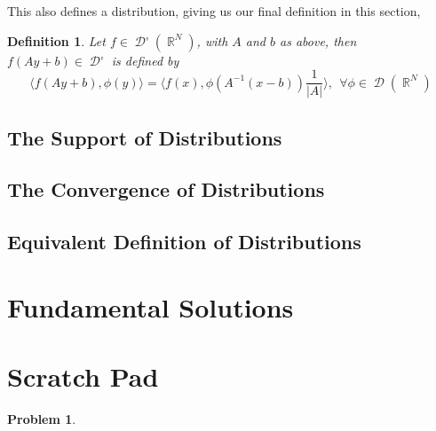 \documentclass[12pt, a4]{article}
\newtheorem{definition}{Definition}[section]
\newtheorem{problem}[theorem]{Problem}
\DeclareMathOperator\reals{\mathbb{R}}
\DeclareMathOperator\tfspaceD{\mathcal{D}}
\DeclareMathOperator\dist{\mathcal{D'}}
\begin{document}
This also defines a distribution, giving us our final definition in this section,

\begin{definition}
    Let $f \in \dist(\reals^N)$, with $A$ and $b$ as above, then $f(Ay+b) \in \dist$ is defined by \[\langle f(Ay+b), \phi(y)\rangle = \langle f(x), \phi(A^{-1}(x-b))\frac{1}{|A|}\rangle, \> \> \forall \phi \in \tfspaceD(\reals^N)\]
\end{definition}

\subsection{The Support of Distributions}

\subsection{The Convergence of Distributions}

\subsection{Equivalent Definition of Distributions}


\section{Fundamental Solutions}


\section{Scratch Pad}

\begin{problem}

\end{problem}
\end{document}
